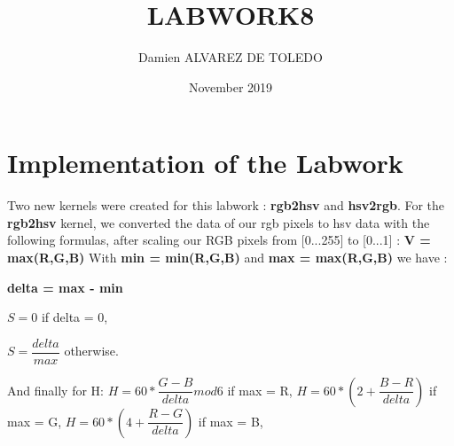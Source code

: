 \documentclass{article}
\title{LABWORK8}
\author{Damien ALVAREZ DE TOLEDO }
\date{November 2019}
\begin{document}
\maketitle

\section{Implementation of the Labwork}\newline

Two new kernels were created for this labwork : \textbf{rgb2hsv} and \textbf{hsv2rgb}.\newline
For the \textbf{rgb2hsv} kernel, we converted the data of our rgb pixels to hsv data with the following formulas, after scaling our RGB pixels from [0...255] to [0...1] :\newline
\newline
\textbf{V = max(R,G,B)}
\newline
\newline 
With \textbf{min = min(R,G,B)} and \textbf{max = max(R,G,B)} we have :\newline

\textbf{delta = max - min}\newline
\newline

\textbf{$S=0$} if delta = 0,\newline
\newline

\textbf{$S=\dfrac{delta}{max}$} otherwise.\newline
\newline

And finally for H:
\newline
\newline
$H = 60 * \dfrac{G - B}{delta}mod6$ if max = R,
\newline
\newline
$H = 60 * (2 + \dfrac{B - R}{delta})$ if max = G,
\newline
\newline
$H = 60 * (4 + \dfrac{R - G}{delta})$ if max = B,
\newline
\newline
\newline

\newline
\newline
\end{document}

